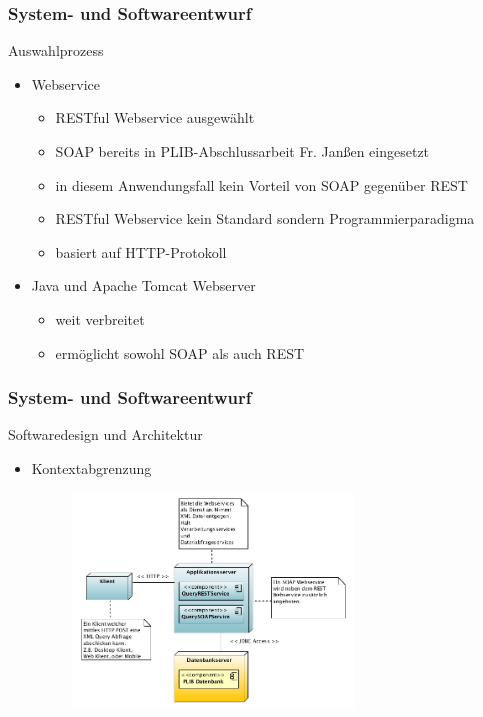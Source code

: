 \documentclass[serif,mathserif]{beamer}
\begin{document}
\begin{frame}
  \frametitle{System- und Softwareentwurf}
  Auswahlprozess
  \begin{itemize}
  \item Webservice
  	  \begin{itemize}
	  \item RESTful Webservice ausgewählt
           \item SOAP bereits in PLIB-Abschlussarbeit Fr. Janßen eingesetzt
           \item in diesem Anwendungsfall kein Vorteil von SOAP gegenüber REST
           \item RESTful Webservice kein Standard sondern Programmierparadigma
           \item basiert auf HTTP-Protokoll
           \end{itemize} 
   \item Java und Apache Tomcat Webserver
  	  \begin{itemize}
           \item weit verbreitet
           \item ermöglicht sowohl SOAP als auch REST
           \end{itemize} 
  \end{itemize}
\end{frame}

\begin{frame}
  \frametitle{System- und Softwareentwurf}
  Softwaredesign und Architektur
  \begin{itemize}
  \item Kontextabgrenzung
     \begin{figure}[t]
     \includegraphics[width=7.5cm]{images/bausteinsicht_plib_level0.png}
     \end{figure}
  \end{itemize}
 \end{frame}
 
\end{document}
